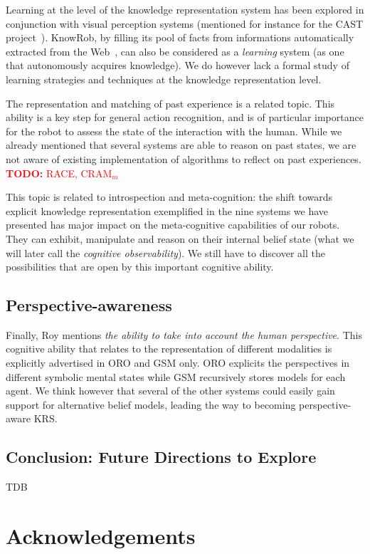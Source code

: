 \documentclass[journal]{IEEEtran}
\newcommand{\todo}[1]{\textcolor{red}{\textbf{TODO:} #1}}
\begin{document}
Learning at the level of the knowledge representation system has been explored
in conjunction with visual perception systems (mentioned for instance for the
CAST project~\cite{jacobsson2008crossmodal}). {\sc KnowRob}, by filling its 
pool of facts from informations automatically extracted from the 
Web~\cite{tenorth10webinstructions}, can also be considered as a \emph{learning} 
system (as one that autonomously acquires knowledge). We do however lack a 
formal study of learning strategies and techniques at the knowledge 
representation level.

The representation and matching of past experience is a related topic. This ability
is a key step for general action recognition, and is of particular importance
for the robot to assess the state of the interaction with the human.
While we already mentioned that several systems are able to reason on past
states, we are not aware of existing implementation of algorithms to reflect on
past experiences. \todo{RACE, CRAM$_m$}

This topic is related to introspection and meta-cognition: the shift towards
explicit knowledge representation exemplified in the nine systems we have
presented has major impact on the meta-cognitive capabilities of our robots.
They can exhibit, manipulate and reason on their internal belief state (what we
will later call the \emph{cognitive observability}). We still have to discover 
all the possibilities that are open by this important cognitive ability.


\subsection{Perspective-awareness}

Finally, Roy mentions \emph{the ability to take into account the human
perspective}. This cognitive ability that relates to the representation of
different modalities is explicitly advertised in ORO and GSM only. ORO
explicits the perspectives in different symbolic mental states while GSM
recursively stores models for each agent.  We think however that several 
of the other systems could easily gain support for alternative belief models, 
leading the way to becoming perspective-aware KRS.


\subsection{Conclusion: Future Directions to Explore}

TDB

\section*{Acknowledgements} 




\end{document}
